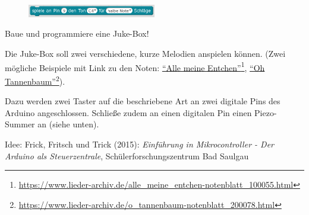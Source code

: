 \begin{projekt}\label{proj:jukebox}
	\begin{figure}
		\centering
		\vspace{-\baselineskip}
		\includegraphics[width=0.5\textwidth]{pics/piezo-steuerung.png}
		\vspace{-\baselineskip}
		\label{abb:piezo-steuerung}
	\end{figure}
	Baue und programmiere eine Juke-Box!
	
	Die Juke-Box soll zwei verschiedene, kurze Melodien anspielen können.	
	(Zwei mögliche Beispiele mit Link zu den Noten: \href{https://www.lieder-archiv.de/alle\_meine\_entchen-notenblatt\_100055.html}{\enquote{Alle meine Entchen}}\footnote{\url{https://www.lieder-archiv.de/alle\_meine\_entchen-notenblatt\_100055.html}}, \href{https://www.lieder-archiv.de/o\_tannenbaum-notenblatt\_200078.html}{\enquote{Oh Tannenbaum}}\footnote{\url{https://www.lieder-archiv.de/o\_tannenbaum-notenblatt\_200078.html}}). 
	
	Dazu werden zwei Taster auf die beschriebene Art an zwei digitale Pins des Arduino angeschlossen. Schließe zudem an einen digitalen Pin einen Piezo-Summer an (siehe unten). 
	
	{\scriptsize Idee: Frick, Fritsch und Trick (2015): \emph{Einführung in Mikrocontroller - Der Arduino als Steuerzentrale}, Schülerforschungszentrum Bad Saulgau}
\end{projekt}

